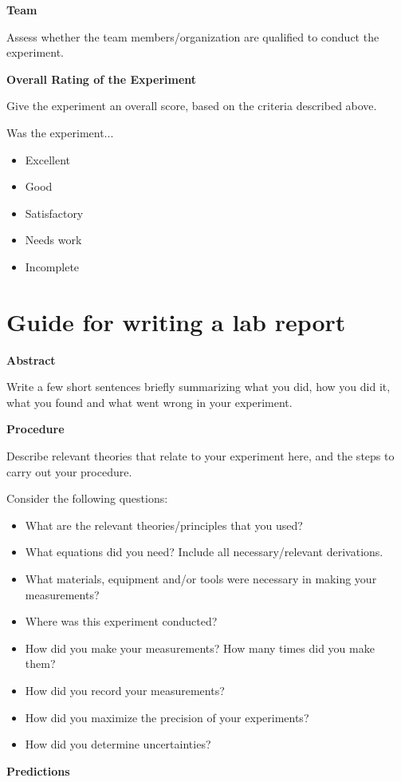 \textbf{Team}

Assess whether the team members/organization are qualified to conduct the experiment.

\textbf{Overall Rating of the Experiment}

Give the experiment an overall score, based on the criteria described above.

Was the experiment...
\begin{itemize}
\item Excellent
\item Good
\item Satisfactory
\item Needs work
\item Incomplete
\end{itemize}

\newpage
\section{Guide for writing a lab report}
 \vspace{0.25cm}
\textbf{Abstract}

Write a few short sentences briefly summarizing what you did, how you did it, what you found and what went wrong in your experiment.

\textbf{Procedure}

Describe relevant theories that relate to your experiment here, and the steps to carry out your procedure. 

Consider the following questions:
\begin{itemize}
\item What are the relevant theories/principles that you used? 
\item What equations did you need? Include all necessary/relevant derivations.
\item What materials, equipment and/or tools were necessary in making your measurements?
\item Where was this experiment conducted?
\item How did you make your measurements? How many times did you make them?
\item How did you record your measurements?
\item How did you maximize the precision of your experiments?
\item How did you determine uncertainties?
\end{itemize}

\textbf{Predictions}

